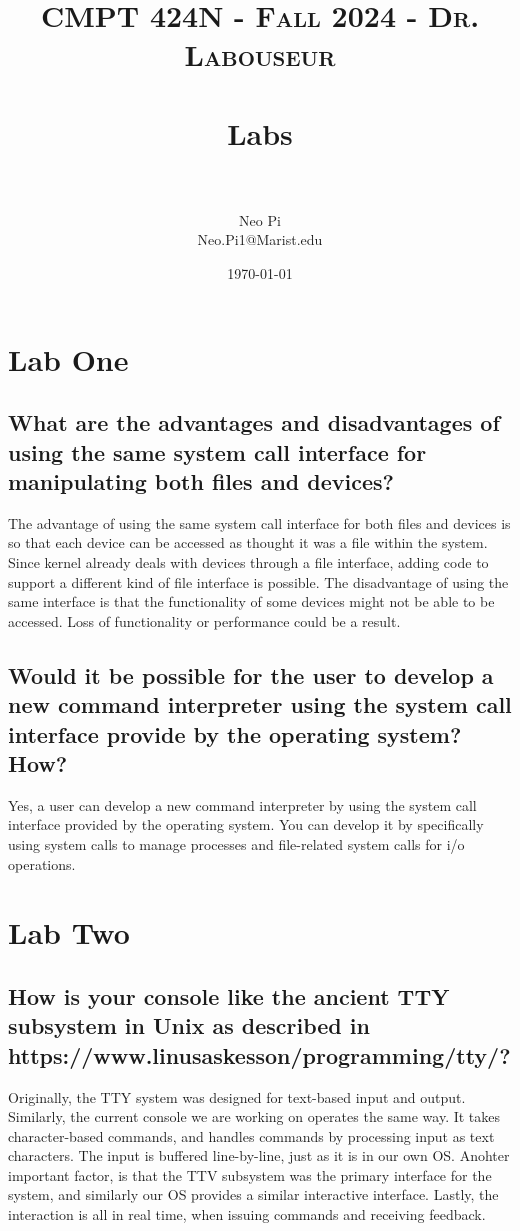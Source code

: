 \documentclass[letterpaper, 10pt,DIV=13]{scrartcl}
\title{	
   \normalfont \normalsize 
   \textsc{CMPT 424N - Fall 2024 - Dr. Labouseur} \\[10pt] %
   \horrule{0.5pt} \\[0.25cm] 	%
   \huge Labs  \\     	    %
   \horrule{0.5pt} \\[0.25cm] 	%
}
\author{Neo Pi \\ \normalsize Neo.Pi1@Marist.edu}
\date{\normalsize\today} 	%
\numberwithin{equation}{section} %
\numberwithin{figure}{section} %
\numberwithin{table}{section} %
\begin{document}
\maketitle %

\section{Lab One}

\subsection{What are the advantages and disadvantages of using the same system call interface for manipulating both files and devices?}
The advantage of using the same system call interface for both files and devices is so that each device can be accessed as thought it was a file within the system. Since kernel already deals with devices through a file interface, adding code to support a different kind of file interface is possible. 
The disadvantage of using the same interface is that the functionality of some devices might not be able to be accessed. Loss of functionality or performance could be a result.

\subsection{Would it be possible for the user to develop a new command interpreter using the system call interface provide by the operating system? How?}
Yes, a user can develop a new command interpreter by using the system call interface provided by the operating system.
You can develop it by specifically using system calls to manage processes and file-related system calls for i/o operations. 

\pagebreak
\section{Lab Two}

\subsection{How is your console like the ancient TTY subsystem in Unix as described in https://www.linusaskesson/programming/tty/?}
Originally, the TTY system was designed for text-based input and output. Similarly, the current console we are working on operates the same way. It takes character-based commands, and handles commands by processing input as text characters. The input is buffered line-by-line, just as it is in our own OS. Anohter important factor, is that the TTV subsystem was the primary interface for the system, and similarly our OS provides a similar interactive interface. Lastly, the interaction is all in real time, when issuing commands and receiving feedback. 
\end{document}
